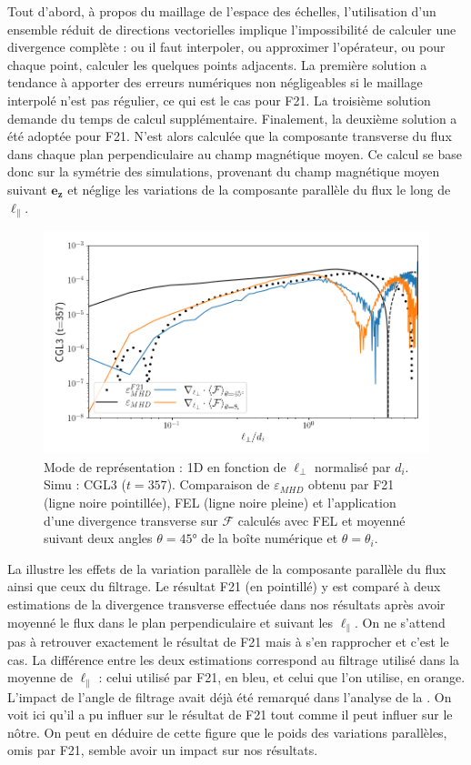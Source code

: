 Tout d'abord, à propos du maillage de l'espace des échelles, l'utilisation d'un ensemble réduit de directions vectorielles implique l'impossibilité de calculer une divergence complète : ou il faut interpoler, ou approximer l'opérateur, ou pour chaque point, calculer les quelques points adjacents. La première solution a tendance à apporter des erreurs numériques non négligeables si le maillage interpolé n'est pas régulier, ce qui est le cas pour \ac{F21}. La troisième solution demande du temps de calcul supplémentaire. Finalement, la deuxième solution a été adoptée pour \ac{F21}. N'est alors calculée que la composante transverse du flux dans chaque plan perpendiculaire au champ magnétique moyen. Ce calcul se base donc sur la symétrie des simulations, provenant du champ magnétique moyen suivant $\boldsymbol{e_z}$ et néglige les variations de la composante parallèle du flux le long de $\ell_{\parallel}$. 
\begin{figure}[!ht]
 \centering
\includegraphics[width=0.9\linewidth,trim=0cm 0cm 0cm 0cm, clip=true]{./Part_3/images_ch2/CGL3_compa_div}
\cprotect\caption{Mode de représentation : \acs{1D} en fonction de $\ell_{\perp}$ normalisé par $d_i$. Simu : CGL3 ($t =\num{357}$). Comparaison de $\varepsilon_{MHD}$ obtenu par \ac{F21} (ligne noire pointillée), \ac{FEL} (ligne noire pleine) et l'application d'une divergence transverse sur $\mathcal{F}$ calculés avec \ac{FEL} et moyenné suivant deux angles $\theta = \ang{45}$ de la boîte numérique et $\theta = \theta_i$. }
\label{fig:compa_div}
\end{figure} 
La  illustre les effets de la variation parallèle de la composante parallèle du flux ainsi que ceux du filtrage. Le résultat \ac{F21} (en pointillé) y est comparé à deux estimations de la divergence transverse effectuée dans nos résultats après avoir moyenné le flux dans le plan perpendiculaire et suivant les $\ell_{\parallel}$. On ne s'attend pas à retrouver exactement le résultat de \ac{F21} mais à s'en rapprocher et c'est le cas. La différence entre les deux estimations correspond au filtrage utilisé dans la moyenne de $\ell_{\parallel}$ : celui utilisé par \ac{F21}, en bleu, et celui que l'on utilise, en orange. L'impact de l'angle de filtrage avait déjà été remarqué dans l'analyse de la . On voit ici qu'il a pu influer sur le résultat de \ac{F21} tout comme il peut influer sur le nôtre. On peut en déduire de cette figure que le poids des variations parallèles, omis par \ac{F21}, semble avoir un impact sur nos résultats. 

